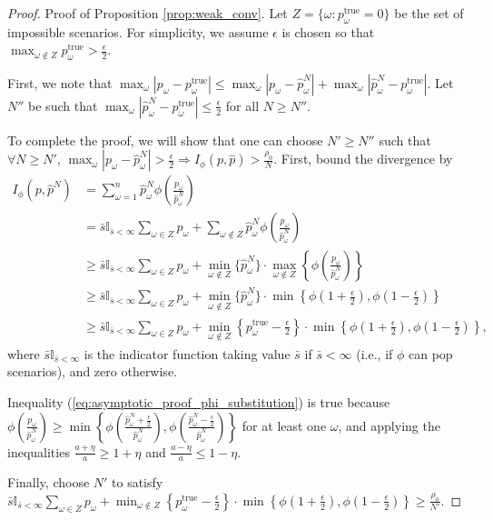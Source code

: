 \documentclass[ijoc,letterpaper]{informs3} %
\newcommand{\ptrue}{p^{\text{true}}}
\begin{document}
\begin{proof}{\sc Proof of Proposition \ref{prop:weak_conv}.}
	Let $Z = \{\omega : \ptrue_\omega = 0\}$ be the set of impossible scenarios.
	For simplicity, we assume $\epsilon$ is chosen so that $\max_{\omega \notin Z} \ptrue_\omega > \frac{\epsilon}{2}$.
	
	First, we note that $\max_\omega |p_\omega - \ptrue_\omega| \leq \max_\omega |p_\omega - \hat{p}^N_\omega| + \max_\omega |\hat{p}^N_\omega - \ptrue_\omega|$.
	Let $N''$ be such that $\max_\omega |\hat{p}^N_\omega - \ptrue_\omega| \leq \frac{\epsilon}{2}$ for all $N \geq N''$.
	
	To complete the proof, we will show that one can choose $N' \geq N''$ such that $\forall N \geq N'$, $\max_\omega |p_\omega - \hat{p}^N_\omega| > \frac{\epsilon}{2} \Rightarrow I_\phi(p,\hat{p}) > \frac{\rho_0}{N}$.
	First, bound the divergence by
	\begin{align}
		I_{\phi}(p,\hat{p}^N) & = \sum_{\omega=1}^n \hat{p}^N_\omega \phi\left( \frac{p_\omega}{\hat{p}^N_\omega} \right) \nonumber \\
		& = \bar{s} \mathbb{I}_{\bar{s} < \infty} \sum_{\omega \in Z} p_\omega + \sum_{\omega \notin Z} \hat{p}^N_\omega \phi\left( \frac{p_\omega}{\hat{p}^N_\omega} \right) \nonumber \\
		& \geq \bar{s} \mathbb{I}_{\bar{s} < \infty} \sum_{\omega \in Z} p_\omega + \min_{\omega \notin Z} \{\hat{p}^N_\omega\} \cdot \max_{\omega \notin Z} \left\{ \phi \left( \frac{p_\omega}{\hat{p}^N_\omega} \right) \right\} \nonumber \\
		& \geq \bar{s} \mathbb{I}_{\bar{s} < \infty} \sum_{\omega \in Z} p_\omega  + \min_{\omega \notin Z} \{\hat{p}^N_\omega\} \cdot \min\left\{ \phi\left(1+\frac{\epsilon}{2}\right), \phi\left(1-\frac{\epsilon}{2}\right) \right\} \label{eq:asymptotic_proof_phi_substitution} \\
		& \geq \bar{s} \mathbb{I}_{\bar{s} < \infty} \sum_{\omega \in Z} p_\omega + \min_{\omega \notin Z} \left\{ \ptrue_\omega - \frac{\epsilon}{2} \right\} \cdot \min\left\{ \phi\left(1+\frac{\epsilon}{2}\right), \phi\left(1-\frac{\epsilon}{2}\right) \right\} \nonumber,
	\end{align}
	where $\bar{s}\mathbb{I}_{\bar{s} < \infty}$ is the indicator function taking value $\bar{s}$ if $\bar{s} < \infty$ (i.e., if $\phi$ can pop scenarios), and zero otherwise.
	
	Inequality (\ref{eq:asymptotic_proof_phi_substitution}) is true because $\phi \left( \frac{p_\omega}{\hat{p}^N_\omega} \right) \geq \min\left\{ \phi\left( \frac{\hat{p}^N_\omega+\tfrac{\epsilon}{2}}{\hat{p}^N_\omega} \right), \phi\left( \frac{\hat{p}^N_\omega-\tfrac{\epsilon}{2}}{\hat{p}^N_\omega} \right) \right\}$ for at least one $\omega$, and applying the inequalities $\frac{a+\eta}{a} \geq 1 + \eta$ and $\frac{a-\eta}{a} \leq 1-\eta$.
	
	Finally, choose $N'$ to satisfy $\bar{s} \mathbb{I}_{\bar{s} < \infty} \sum_{\omega \in Z} p_\omega + \min_{\omega \notin Z} \left\{ \ptrue_\omega - \frac{\epsilon}{2} \right\} \cdot \min\left\{ \phi\left(1+\frac{\epsilon}{2}\right), \phi\left(1-\frac{\epsilon}{2}\right) \right\} \geq \frac{\rho_0}{N'}$.
	\Halmos
\end{proof}
\end{document}
